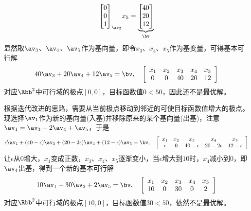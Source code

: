 \documentclass{ctexart}
\begin{document}
\begin{example}
\begin{align*}
{\begin{bmatrix}
                            0 \\ 0 \\ 1
                        \end{bmatrix}}_{\av_5} x_5 =
        \underbrace{\begin{bmatrix}
                            40 \\ 20 \\ 12
                        \end{bmatrix}}_{\bv}
    \end{align*}
    显然取$\av_3$、$\av_4$、$\av_5$作为基向量，即令$x_3$、$x_4$、$x_5$作为基变量，可得基本可行解
    \begin{align*}
        40 \av_3 + 20 \av_4 + 12 \av_5 = \bv, \quad
        \left[ \begin{array}{ccccc}
                       x_1 & x_2 & x_3 & x_4 & x_5 \\
                       0   & 0   & 40  & 20  & 12
                   \end{array} \right]
    \end{align*}
    对应$\Rbb^2$中可行域的极点$[0,0]$，目标函数值$0 < 50$，因此还不是最优解。

    根据迭代改进的思路，需要从当前极点移动到邻近的可使目标函数值增大的极点。现选择$\av_1$作为新的基向量(入基)并移除原来的某个基向量(出基)，注意$\av_1 = \av_3 + 2 \av_4 + \av_5$，于是
    \begin{align*}
        \epsilon \av_1 + (40 - \epsilon) \av_3 + (20 - 2 \epsilon) \av_4 + (12 - \epsilon) \av_5 = \bv, \quad
        \left[ \begin{array}{ccccc}
                       x_1      & x_2 & x_3           & x_4             & x_5           \\
                       \epsilon & 0   & 40 - \epsilon & 20 - 2 \epsilon & 12 - \epsilon
                   \end{array} \right]
    \end{align*}
    让$\epsilon$从$0$增大，$x_1$变成正数，$x_3$、$x_4$、$x_5$逐渐变小，当$\epsilon$增大到$10$时，$x_4$减小到$0$，即$\av_4$出基，得到一个新的基本可行解
    \begin{align*}
        10 \av_1 + 30 \av_3 + 2 \av_5 = \bv, \quad
        \left[ \begin{array}{ccccc}
                       x_1 & x_2 & x_3 & x_4 & x_5 \\
                       10  & 0   & 30  & 0   & 2
                   \end{array} \right]
    \end{align*}
    对应$\Rbb^2$中可行域的极点$[10,0]$，目标函数值$30 < 50$，依然不是最优解。


\end{example}
\end{document}
